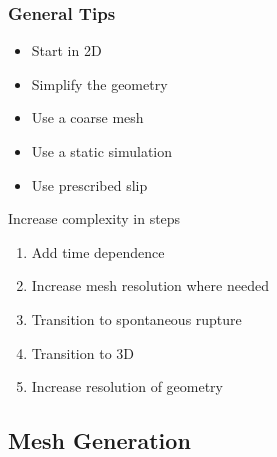 \documentclass[aspectratio=169]{beamer}
\begin{document}
\begin{frame}[t]
\end{frame}

\begin{frame}
  \frametitle{General Tips}
  \summary{}

  \begin{itemize}
    \begin{itemize}
    \item Start in 2D
    \item Simplify the geometry
    \item Use a coarse mesh
    \item Use a static simulation
    \item Use prescribed slip
    \end{itemize}
    \hitem Increase complexity in steps
    \begin{enumerate}
    \item Add time dependence
    \item Increase mesh resolution where needed
    \item Transition to spontaneous rupture
    \item Transition to 3D
    \item Increase resolution of geometry
    \end{enumerate}
  \end{itemize}
  
\end{frame}


\subsection{Mesh Generation}
\end{document}
